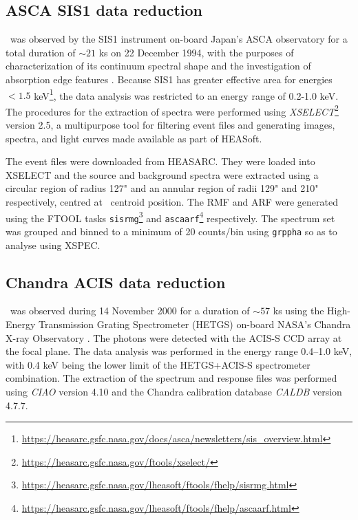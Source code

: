     \subsection{ASCA SIS1 data reduction}
    	\source\ was observed by the SIS1 instrument on-board Japan's ASCA observatory for a total duration of $\sim 21$ ks on 22 December 1994, with the purposes of characterization of its continuum spectral shape and the investigation of absorption edge features \cite{ebisawaAsca2001ApJ}. Because SIS1 has greater effective area for energies $<1.5$ keV\footnote{\url{https://heasarc.gsfc.nasa.gov/docs/asca/newsletters/sis_overview.html}}, the data analysis was restricted to an energy range of 0.2-1.0 keV. The procedures for the extraction of spectra were performed using \textit{XSELECT}\footnote{\url{https://heasarc.gsfc.nasa.gov/ftools/xselect/}} version 2.5, a multipurpose tool for filtering event files and generating images, spectra, and light curves made available as part of HEASoft.
    	
    	The event files were downloaded from HEASARC. They were loaded into XSELECT and the source and background spectra were extracted using a circular region of radius 127" and an annular region of radii 129" and 210" respectively, centred at \source\ centroid position. The RMF and ARF were generated using the FTOOL tasks \texttt{sisrmg}\footnote{\url{https://heasarc.gsfc.nasa.gov/lheasoft/ftools/fhelp/sisrmg.html}} and \texttt{ascaarf}\footnote{\url{https://heasarc.gsfc.nasa.gov/lheasoft/ftools/fhelp/ascaarf.html}} respectively. The spectrum set was grouped and binned to a minimum of 20 counts/bin using \texttt{grppha} so as to analyse using XSPEC.
    
    \subsection{Chandra ACIS data reduction}
    	\source\ was observed during 14 November 2000 for a duration of $\sim 57$ ks using the High-Energy Transmission Grating Spectrometer (HETGS) on-board NASA's Chandra X-ray Observatory \cite{beardaChandra2002AA}. The photons were detected with the ACIS-S CCD array at the focal plane. The data analysis was performed in the energy range 0.4--1.0 keV, with 0.4 keV being the lower limit of the HETGS+ACIS-S spectrometer combination. The extraction of the spectrum and response files was performed using \textit{CIAO} version 4.10 and the Chandra calibration database \textit{CALDB} version 4.7.7.
    	
